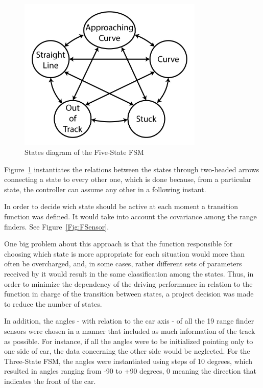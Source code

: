 	\begin{figure}[h]
		
		\centering
		\includegraphics[width=250pt]{FiveStateFSM}
		\caption{States diagram of the Five-State FSM}
		\label{Fig:FSM5Diagram}
		
	\end{figure}
	
	Figure~\ref{Fig:FSM5Diagram} instantiates the relations between the states through two-headed arrows connecting a state to every other one, which is done because, from a particular state, the controller can assume any other in a following instant.
	
	In order to decide wich state should be active at each moment a transition function was defined. It would take into account the covariance among the range finders. See Figure~\ref{Fig:FSensor}.
	
	One big problem about this approach is that the function responsible for choosing which state is more appropriate for each situation would more than often be overcharged, and, in some cases, rather different sets of parameters received by it would result in the same classification among the states. Thus, in order to minimize the dependency of the driving performance in relation to the function in charge of the transition between states, a project decision was made to reduce the number of states.
	
	In addition, the angles - with relation to the car axis - of all the 19 range finder sensors were chosen in a manner that included as much information of the track as possible. For instance, if all the angles were to be initialized pointing only to one side of car, the data concerning the other side would be neglected. For the Three-State FSM, the angles were instantiated using steps of 10 degrees, which resulted in angles ranging from -90 to +90 degrees, 0 meaning the direction that indicates the front of the car.
		
